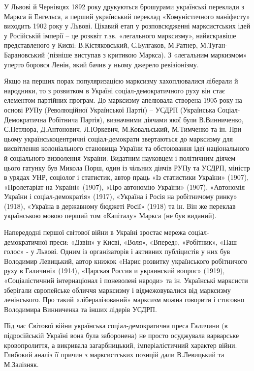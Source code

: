 \documentclass{kapital}
\begin{document}
У Львові й Чернівцях 1892 року друкуються брошурами українські переклади з Маркса й Енгельса, а перший український переклад «Комуністичного маніфесту» виходить 1902 року у Львові.             	Цікавий етап у розповсюдженні марксистських ідей у Російській імперії – це розквіт т.зв. «легального марксизму», найяскравіше представленого у Києві: В.Кістяковський, С.Булгаков, М.Ратнер, М.Туган-Барановський (пізніше виступав з критикою Маркса). З «легальним маркизмом» уперто боровся Ленін, який бачив у ньому джерело ревізіонізму.
 
	Якщо на перших порах популяризацією марксизму хахоплювалися ліберали й народники, то з розвитком в Україні соціал-демократичного руху він стає елементом партійних програм. До марксизму апелювала створена 1905 року на основі РУПу (Революційної Української Партії) – УСДРП (Українська Соціал-Демократична Робітнича Партія), визначними діячами якої були В.Винниченко, С.Петлюра, Д.Антонович, Л.Юркевич, М.Ковальський, М.Тимченко та ін.   При цьому українськоцентричні соціал-демократи  звертаються до марксизму для висвітлення колоніального становища України та  обстоювання ідеї національного й соціального визволення України. Видатним науковцем і політичним діячем цього гатунку був Микола Порш, один із чільних діячів РУПу та УСДРП, міністр в урядах УНР, соціолог і статистик, автор праць  «Із статистики України» (1907), «Пролетаріат на Україні» (1907), «Про автономію України» (1907), «Автономія України і соціал-демократія» (1917), «Україна і Росія на робітничому ринку» (1918), «Україна в державному бюджеті  Росії» (1918) та ін. Він же переклав українською мовою перший том «Капіталу» Маркса (не був виданий).  	  	
 
	 Напередодні першої світової війни в Україні зростає мережа соціал-демократичної преси: «Дзвін» у Києві, «Воля», «Вперед», «Робітник», «Наш голос» - у Львові. Одним із організаторів і активних публіцистів у них був Володимир Левицький, автор книжок «Нарис розвитку українського робітничого руху в Галичині» (1914), «Царская Россия и украинский вопрос» (1919), «Соціалістичний інтернаціонал і поневолені народи» та ін. Українські марксисти зберігали європейське обличчя марксизму і відмежовувалися від марксизму ленінського. Про такий «лібералізований» марксизм можна говорити і стосовно Володимира Винниченка та інших лідерів УСДРП.    
 
	Під час Світової війни українська соціал-демократична преса Галичини (в підросійській Україні вона була заборонена) не просто осуджувала варварське  кровопролиття, а викривала загарбницький, імперіалістичний характер війни. Глибокий аналіз її причин з марксистських позицій дали В.Левицький та М.Залізняк. 
 
\end{document}
